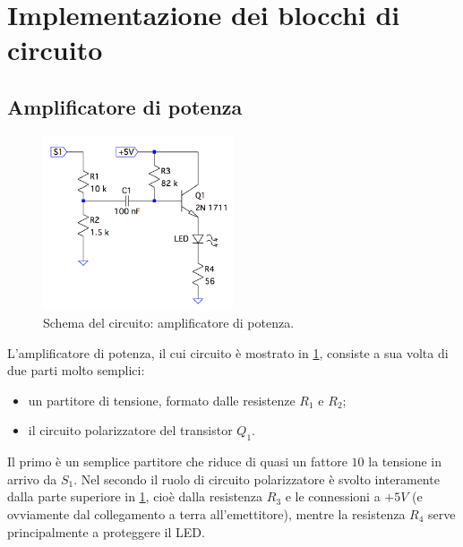 \documentclass[a4paper,10pt]{article}
\begin{document}
\pagebreak

\section{Implementazione dei blocchi di circuito}

\subsection{Amplificatore di potenza}

\begin{figure}
	\vspace{-10pt}
	\centering
	\includegraphics[width=0.5\textwidth]{../grafici/PowerAmp.png}
	\vspace{-12pt}
	\caption{Schema del circuito: amplificatore di potenza.}
	\label{fig:powamp}
	\vspace{-12pt}
\end{figure}

L'amplificatore di potenza, il cui circuito è mostrato in \cref{fig:powamp}, consiste a sua volta di due parti molto semplici:

\begin{itemize}
	\item un partitore di tensione, formato dalle resistenze $ R_1 $ e $ R_2 $;
	\item il circuito polarizzatore del transistor $ Q_1 $.
\end{itemize}

Il primo è un semplice partitore che riduce di quasi un fattore $ 10 $ la tensione in arrivo da $ S_1 $.
Nel secondo il ruolo di circuito polarizzatore è svolto interamente dalla parte superiore in \cref{fig:powamp}, cioè dalla resistenza $ R_3 $ e le connessioni a $ + \unit{5}{V} $ (e ovviamente dal collegamento a terra all'emettitore), mentre la resistenza $ R_4 $ serve principalmente a proteggere il LED.
\end{document}
